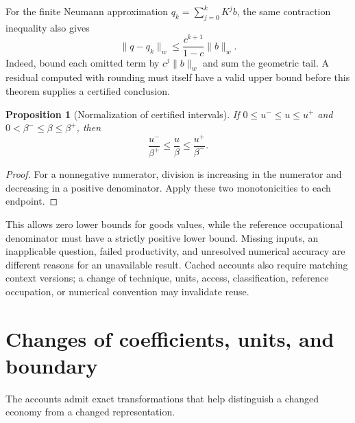 \documentclass[11pt,a4paper]{article}
\newtheorem{proposition}[theorem]{Proposition}
\begin{document}
For the finite Neumann approximation $q_k=\sum_{j=0}^{k}K^j b$, the same contraction inequality also gives
\begin{equation}
\|q-q_k\|_w\leq\frac{c^{k+1}}{1-c}\|b\|_w.
\end{equation}
Indeed, bound each omitted term by $c^j\|b\|_w$ and sum the geometric tail. A residual computed with rounding must itself have a valid upper bound before this theorem supplies a certified conclusion.

\begin{proposition}[Normalization of certified intervals]
If $0\leq u^-\leq u\leq u^+$ and $0<\beta^-\leq\beta\leq\beta^+$, then
\begin{equation}
\frac{u^-}{\beta^+}\leq\frac u\beta\leq\frac{u^+}{\beta^-}.
\end{equation}
\end{proposition}
\begin{proof}
For a nonnegative numerator, division is increasing in the numerator and decreasing in a positive denominator. Apply these two monotonicities to each endpoint.
\end{proof}

This allows zero lower bounds for goods values, while the reference occupational denominator must have a strictly positive lower bound. Missing inputs, an inapplicable question, failed productivity, and unresolved numerical accuracy are different reasons for an unavailable result. Cached accounts also require matching context versions; a change of technique, units, access, classification, reference occupation, or numerical convention may invalidate reuse.

\section{Changes of coefficients, units, and boundary}
The accounts admit exact transformations that help distinguish a changed economy from a changed representation.
\end{document}
